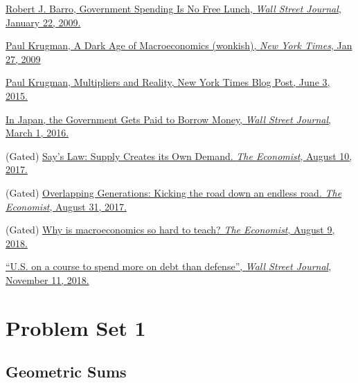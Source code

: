 \documentclass[]{book}
\theoremstyle{definition}
\theoremstyle{definition}
\theoremstyle{definition}
\theoremstyle{remark}
\begin{document}
\href{https://search.proquest.com/docview/399114897/CBD1D9A468D04A85PQ/2?accountid=14512}{Robert
J. Barro, Government Spending Is No Free Lunch, \emph{Wall Street
Journal}, January 22, 2009.}

\href{https://search.proquest.com/docview/1930920374/1A771BC8177A4FB7PQ/1?accountid=14512}{Paul
Krugman, A Dark Age of Macroeconomics (wonkish), \emph{New York Times},
Jan 27, 2009}

\href{https://krugman.blogs.nytimes.com/2015/06/03/multipliers-and-reality/}{Paul
Krugman, Multipliers and Reality, New York Times Blog Post, June 3,
2015.}

\href{https://search.proquest.com/docview/1768757479/E1052F8FA6974859PQ/1?accountid=14512}{In
Japan, the Government Gets Paid to Borrow Money, \emph{Wall Street
Journal}, March 1, 2016.}

(Gated)
\href{https://www.economist.com/economics-brief/2017/08/10/says-law-supply-creates-its-own-demand}{Say's
Law: Supply Creates its Own Demand. \emph{The Economist}, August 10,
2017.}

(Gated)
\href{https://www.economist.com/economics-brief/2017/08/31/kicking-the-can-down-an-endless-road}{Overlapping
Generations: Kicking the road down an endless road. \emph{The
Economist}, August 31, 2017.}

(Gated)
\href{https://www.economist.com/finance-and-economics/2018/08/09/why-is-macroeconomics-so-hard-to-teach}{Why
is macroeconomics so hard to teach? \emph{The Economist}, August 9,
2018.}

\href{https://search.proquest.com/docview/2131663609/B6DB7A44958C4606PQ/1?accountid=14512}{``U.S.
on a course to spend more on debt than defense'', \emph{Wall Street
Journal}, November 11, 2018.}

\appendix


\hypertarget{pset1}{\chapter{Problem Set 1}\label{pset1}}

\section{Geometric Sums}\label{geometric-sums}
\end{document}
